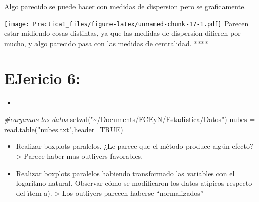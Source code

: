 \documentclass[
]{article}
\newenvironment{Shaded}{\begin{snugshade}}{\end{snugshade}}
\newcommand{\AttributeTok}[1]{\textcolor[rgb]{0.77,0.63,0.00}{#1}}
\newcommand{\CommentTok}[1]{\textcolor[rgb]{0.56,0.35,0.01}{\textit{#1}}}
\newcommand{\ConstantTok}[1]{\textcolor[rgb]{0.00,0.00,0.00}{#1}}
\newcommand{\FunctionTok}[1]{\textcolor[rgb]{0.00,0.00,0.00}{#1}}
\newcommand{\NormalTok}[1]{#1}
\newcommand{\OtherTok}[1]{\textcolor[rgb]{0.56,0.35,0.01}{#1}}
\newcommand{\SpecialCharTok}[1]{\textcolor[rgb]{0.00,0.00,0.00}{#1}}
\newcommand{\StringTok}[1]{\textcolor[rgb]{0.31,0.60,0.02}{#1}}
\providecommand{\tightlist}{%
  \setlength{\itemsep}{0pt}\setlength{\parskip}{0pt}}
\begin{document}
Algo parecido se puede hacer con medidas de dispersion pero se
graficamente.

\begin{Shaded}
\end{Shaded}

\texttt{[image: Practica1\_files/figure-latex/unnamed-chunk-17-1.pdf]}
Parecen estar midiendo cosas distintas, ya que las medidas de dispersion
difieren por mucho, y algo parecido pasa con las medidas de centralidad.
****

\hypertarget{ejericio-6}{%
\section{EJericio 6:}\label{ejericio-6}}

\begin{itemize}
\tightlist
\item
\end{itemize}

\begin{Shaded}
\begin{Highlighting}[]
\CommentTok{\#cargamos los datos }
\FunctionTok{setwd}\NormalTok{(}\StringTok{"\textasciitilde{}/Documents/FCEyN/Estadistica/Datos"}\NormalTok{)}
\NormalTok{nubes }\OtherTok{=} \FunctionTok{read.table}\NormalTok{(}\StringTok{"nubes.txt"}\NormalTok{,}\AttributeTok{header=}\ConstantTok{TRUE}\NormalTok{)}
\end{Highlighting}
\end{Shaded}

\begin{itemize}
\item
  Realizar boxplots paralelos. ¿Le parece que el método produce algún
  efecto? \textgreater{} Parece haber mas outliyers favorables.
\item
  Realizar boxplots paralelos habiendo transformado las variables con el
  logaritmo natural. Observar cómo se modificaron los datos atı́picos
  respecto del ı́tem a). \textgreater{} Los outliyers parecen haberse
  ``normalizados''
\end{itemize}
\end{document}
